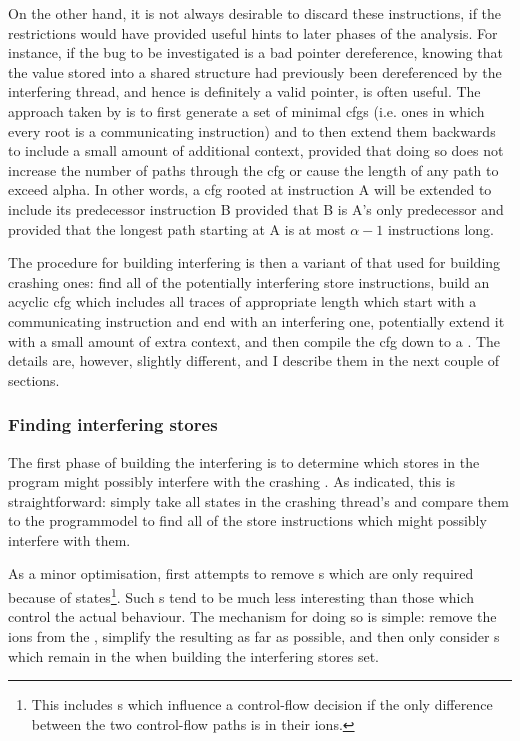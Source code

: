 On the other hand, it is not always desirable to discard these
instructions, if the restrictions would have provided useful hints to
later phases of the analysis.  For instance, if the bug to be
investigated is a bad pointer dereference, knowing that the value
stored into a shared structure had previously been dereferenced by the
interfering thread, and hence is definitely a valid pointer, is often
useful.  The approach taken by {\implementation} is to first generate
a set of minimal \glspl{cfg} (i.e. ones in which every root is a
communicating instruction) and to then extend them backwards to
include a small amount of additional context, provided that doing so
does not increase the number of paths through the \gls{cfg} or
cause the length of any path to exceed \gls{alpha}.  In other
words, a \gls{cfg} rooted at instruction A will be extended to
include its predecessor instruction B provided that B is A's only
predecessor and provided that the longest path starting at A is at
most $\alpha - 1$ instructions long.

The procedure for building interfering {\StateMachines} is then a
variant of that used for building crashing ones: find all of the
potentially interfering store instructions, build an acyclic \gls{cfg} which
includes all traces of appropriate length which start with a
communicating instruction and end with an interfering one, potentially
extend it with a small amount of extra context, and then compile the
\gls{cfg} down to a {\StateMachine}.  The details are, however, slightly
different, and I describe them in the next couple of sections.

\subsubsection{Finding interfering stores}


The first phase of building the interfering {\StateMachines} is to
determine which stores in the program might possibly interfere with
the crashing {\StateMachine}.  As indicated, this is straightforward:
simply take all  states in the crashing thread's
{\StateMachine} and compare them to the \gls{programmodel} to
find all of the store instructions which might possibly interfere with
them.

As a minor optimisation, {\implementation} first attempts to remove
s which are only required because of 
states\footnote{This includes s which influence a
  {\StateMachine} control-flow decision if the only difference between
  the two control-flow paths is in their ions.}.  Such
s tend to be much less interesting than those which
control the {\StateMachines} actual behaviour.  The mechanism for
doing so is simple: remove the ions from the
{\StateMachine}, simplify the resulting {\StateMachine} as far as
possible, and then only consider s which remain in the
{\StateMachine} when building the interfering stores set.

